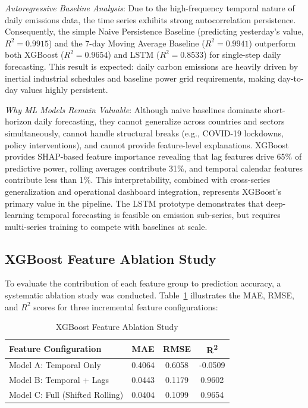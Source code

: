 \documentclass[conference]{IEEEtran}
\begin{document}
\textit{Autoregressive Baseline Analysis}: Due to the high-frequency temporal nature of daily emissions data, the time series exhibits strong autocorrelation persistence. Consequently, the simple Naive Persistence Baseline (predicting yesterday's value, $R^2 = 0.9915$) and the 7-day Moving Average Baseline ($R^2 = 0.9941$) outperform both XGBoost ($R^2 = 0.9654$) and LSTM ($R^2 = 0.8533$) for single-step daily forecasting. This result is expected: daily carbon emissions are heavily driven by inertial industrial schedules and baseline power grid requirements, making day-to-day values highly persistent.

\textit{Why ML Models Remain Valuable}: Although naive baselines dominate short-horizon daily forecasting, they cannot generalize across countries and sectors simultaneously, cannot handle structural breaks (e.g., COVID-19 lockdowns, policy interventions), and cannot provide feature-level explanations. XGBoost provides SHAP-based feature importance revealing that lag features drive 65\% of predictive power, rolling averages contribute 31\%, and temporal calendar features contribute less than 1\%. This interpretability, combined with cross-series generalization and operational dashboard integration, represents XGBoost's primary value in the pipeline. The LSTM prototype demonstrates that deep-learning temporal forecasting is feasible on emission sub-series, but requires multi-series training to compete with baselines at scale.

\subsection{XGBoost Feature Ablation Study}
To evaluate the contribution of each feature group to prediction accuracy, a systematic ablation study was conducted. Table~\ref{tab:ablation} illustrates the MAE, RMSE, and $R^2$ scores for three incremental feature configurations:

\begin{table}[h]
\caption{XGBoost Feature Ablation Study}
\label{tab:ablation}
\centering
\scriptsize
\begin{tabular}{lccc}
\toprule
\textbf{Feature Configuration} & \textbf{MAE} & \textbf{RMSE} & \textbf{R\textsuperscript{2}} \\
\midrule
Model A: Temporal Only         & 0.4064       & 0.6058        & -0.0509 \\
Model B: Temporal + Lags       & 0.0443       & 0.1179        &  0.9602 \\
Model C: Full (Shifted Rolling) & 0.0404       & 0.1099        &  0.9654 \\
\bottomrule
\end{tabular}
\end{table}
\end{document}
